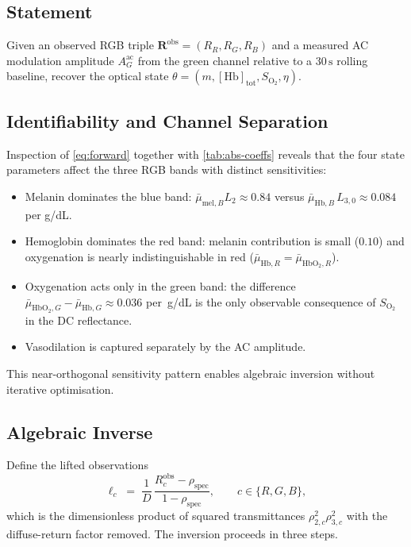 \documentclass[10pt,twocolumn,a4paper]{article}
\theoremstyle{definition}
\newcommand{\Hb}{\mathrm{Hb}}
\newcommand{\HbO}{\mathrm{HbO_2}}
\newcommand{\vaso}{\eta}
\newcommand{\melan}{m}
\newcommand{\Hbconc}{[\Hb]_{\mathrm{tot}}}
\newcommand{\Soxy}{S_{\mathrm{O_2}}}
\begin{document}
\subsection{Statement}

Given an observed RGB triple $\bm{R}^{\mathrm{obs}}=(R_{R},R_{G},R_{B})$
and a measured AC modulation amplitude $A^{\mathrm{ac}}_{G}$ from the
green channel relative to a $30\,\mathrm{s}$ rolling baseline, recover
the optical state $\theta=(\melan,\Hbconc,\Soxy,\vaso)$.

\subsection{Identifiability and Channel Separation}

Inspection of \cref{eq:forward} together with
\cref{tab:abs-coeffs} reveals that the four state parameters affect
the three RGB bands with distinct sensitivities:
\begin{itemize}[leftmargin=*,nosep]
\item Melanin dominates the blue band: $\bar{\mu}_{\mathrm{mel},B} L_{2}\!\approx\!0.84$ versus
  $\bar{\mu}_{\Hb,B}\, L_{3,0}\!\approx\!0.084$ per g/dL.
\item Hemoglobin dominates the red band: melanin contribution is small
  ($0.10$) and oxygenation is nearly indistinguishable in red
  ($\bar{\mu}_{\Hb,R}=\bar{\mu}_{\HbO,R}$).
\item Oxygenation acts only in the green band: the difference
  $\bar{\mu}_{\HbO,G}-\bar{\mu}_{\Hb,G}\approx 0.036$ per~g/dL is the only
  observable consequence of $\Soxy$ in the DC reflectance.
\item Vasodilation is captured separately by the AC amplitude.
\end{itemize}
This near-orthogonal sensitivity pattern enables algebraic inversion
without iterative optimisation.

\subsection{Algebraic Inverse}

Define the lifted observations
\begin{equation}
    \ell_{c}
    \;=\;
    \frac{1}{D}\,\frac{R_{c}^{\mathrm{obs}} - \rho_{\mathrm{spec}}}{1 - \rho_{\mathrm{spec}}},
    \qquad c\in\{R,G,B\},
    \label{eq:lift}
\end{equation}
which is the dimensionless product of squared transmittances
$\rho_{2,c}^{2}\rho_{3,c}^{2}$ with the diffuse-return factor removed.
The inversion proceeds in three steps.
\end{document}
